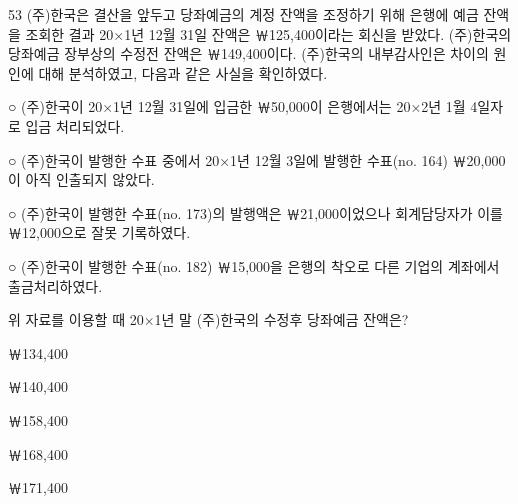 \begin{question}{53}
(주)한국은 결산을 앞두고 당좌예금의 계정 잔액을 조정하기 위해 은행에 예금 잔액을 조회한 결과 20×1년 12월 31일 잔액은 ￦125,400이라는 회신을 받았다. (주)한국의 당좌예금 장부상의 수정전 잔액은 ￦149,400이다. (주)한국의 내부감사인은 차이의 원인에 대해 분석하였고, 다음과 같은 사실을 확인하였다.
\begin{framedtext}
○ (주)한국이 20×1년 12월 31일에 입금한 ￦50,000이 은행에서는 20×2년 1월 4일자로 입금 처리되었다. \par
○ (주)한국이 발행한 수표 중에서 20×1년 12월 3일에 발행한 수표(no. 164) ￦20,000이 아직 인출되지 않았다. \par
○ (주)한국이 발행한 수표(no. 173)의 발행액은 ￦21,000이었으나 회계담당자가 이를 ￦12,000으로 잘못 기록하였다. \par
○ (주)한국이 발행한 수표(no. 182) ￦15,000을 은행의 착오로 다른 기업의 계좌에서 출금처리하였다. \par
\end{framedtext}
위 자료를 이용할 때 20×1년 말 (주)한국의 수정후 당좌예금 잔액은?
\begin{choices}
  \item ￦134,400
  \item ￦140,400
  \item ￦158,400
  \item ￦168,400
  \item ￦171,400
\end{choices}
\end{question}
